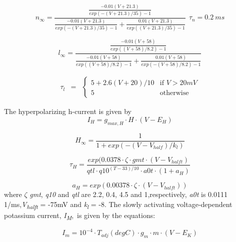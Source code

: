 \documentclass[12pt]{article}
\begin{document}
\begin{equation}
n_{\infty} = \frac{\frac{-0.01(V+21.3)}{exp(-(V+21.3)/35)-1}}{\frac{-0.01(V+21.3)}{exp(-(V+21.3)/35)-1} + \frac{0.01(V+21.3)}{exp( (V+21.3)/35)-1} } \ \ \tau_n=0.2 \ ms
\end{equation}

\begin{equation}
l_{\infty} = \frac{\frac{-0.01(V+58)}{exp( (V+58)/8.2)-1}}{\frac{-0.01(V+58)}{exp( (V+58)/8.2)-1} + \frac{0.01(V+58)}{exp(-(V+58)/8.2)-1}}
\end{equation}

\begin{equation}
\begin{matrix}
\tau_l & =
& \left\{
\begin{matrix}
5+2.6(V+20)/10 & \mbox{if } V > 20 mV \\
5 & \mbox{otherwise }
\end{matrix} \right.
\end{matrix}
\end{equation}


The hyperpolarizing h-current is given by
\begin{equation}
I_H=g_{max, H} \cdot H \cdot (V-E_H)
\end{equation}

\begin{equation}
H_{\infty }=\frac {1}{1+exp(-(V-V_{half})/k_l)}  
\end{equation}

\begin{equation}
\tau_{H}=\frac{exp( 0.0378\cdot \zeta \cdot gmt\cdot
	(V-V_{halft})}{qtl \cdot q10^{(T-33)/10}\cdot a0t \cdot
	(1+a_{H})}
\end{equation}


\begin{equation}
a_{H}=exp( 0.00378\cdot \zeta\cdot (V-V_{halft}))
\end{equation}
where $\zeta$ {\textit{gmt}}{, }{\textit{q10}}{ and }{\textit{qtl}}{ are 2.2, 0.4, 4.5 and 1,respectively, }{\textit{a0t}}{ is 0.0111 1/ms,}{\textit{V}}{\textit{\textsubscript{halft}}}{ = -75mV and }{\textit{k}}{\textit{\textsubscript{l}}}{ = -8.}
The slowly activating voltage‑dependent potassium current, \textit{I}\textit{\textsubscript{M}},~is given by the
equations:


\begin{equation}
I_m=10^{-4}\cdot T_{adj}(degC)\cdot g_m\cdot m\cdot
(V-E_K)
\end{equation}
\end{document}
